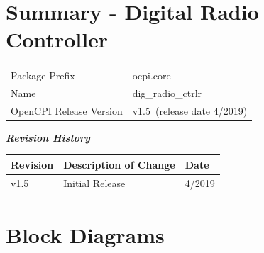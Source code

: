 \documentclass{article}
\author{} %
\date{Version \docVersion} %
\title{\docTitle}
\def\docVersion{1.5}
\def\comp{dig\_radio\_ctrlr}
\def\Comp{Digital Radio Controller}
\begin{document}
\section*{Summary - \Comp}
\begin{longtable}{|p{}
                  |p{}|}
	\hline
	\rowcolor{blue}
	                  &                                        \\
	\hline
	Package Prefix    & ocpi.core \\
	\hline
	Name              & \comp                                  \\
	\hline
	OpenCPI Release Version & v\docVersion ~(release date 4/2019) \\
	\hline
\end{longtable}

\begin{center}
  \textit{\textbf{Revision History}}
  \begin{longtable}{|p{}
                    |p{}
                    |p{}|}
    \hline
    \rowcolor{blue}
    \textbf{Revision} & \textbf{Description of Change} & \textbf{Date} \\
    \hline
    v1.5 & Initial Release & 4/2019 \\
    \hline
  \end{longtable}
\end{center}

\section{Block Diagrams}
\end{document}
